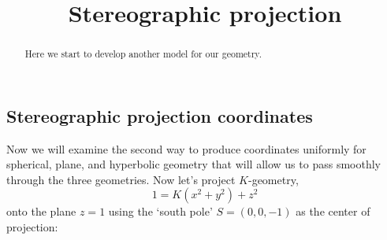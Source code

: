 \documentclass[hints,handout,12pt,noauthor,nooutcomes]{ximera}
\title{Stereographic projection}
\begin{document}
\begin{abstract}
Here we start to develop another model for our geometry.
\end{abstract}
\maketitle


\subsection{Stereographic projection coordinates}

Now we will examine the second way to produce coordinates uniformly for
spherical, plane, and hyperbolic geometry that will allow us to pass smoothly
through the three geometries. Now let's project $K$-geometry,
\[
1=K\left(x^{2}+y^{2}\right)+z^{2} 
\]
onto the plane $z=1$ using the `south pole' $S=(0,0,-1)$ as the center of
projection:
\end{document}
